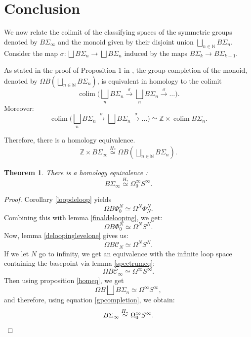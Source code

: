 \documentclass[12pt]{amsart}
\theoremstyle{plain}
\newtheorem{teo}{Theorem}[section]
\theoremstyle{definition}
\theoremstyle{remark}
\newcommand{\C}{\mathcal{C}}
\begin{document}
\section{Conclusion}
We now relate the colimit of the classifying spaces of the symmetric groups denoted by $B\Sigma_\infty$ and the monoid given by their disjoint union $\bigsqcup_{n\in\mathbb{N}} B\Sigma_n$.
Consider the map $\sigma: \bigsqcup B\Sigma_n \rightarrow \bigsqcup B\Sigma_n$ induced by the maps $B\Sigma_k\rightarrow B\Sigma_{k+1}$.

As stated in the proof of Proposition 1 in \cite{mcduffsegal}, the group completion of the monoid, denoted by $\Omega B(\bigsqcup_{n\in\mathbb{N}} B\Sigma_{n})$, is equivalent in homology to the colimit 
\[\operatorname{colim} \bigg(\bigsqcup_n B\Sigma_n\xrightarrow{\sigma} \bigsqcup_n B\Sigma_n\xrightarrow{\sigma}\dots\bigg).\]
Moreover:
\[\operatorname{colim} \bigg(\bigsqcup_n B\Sigma_n\xrightarrow{\sigma} \bigsqcup B\Sigma_n\xrightarrow{\sigma}\dots\bigg) \simeq \mathbb{Z}\times \operatorname{colim}B\Sigma_n.\]

Therefore, there is a homology equivalence.
\begin{align}\label{gpcompletion}
\mathbb{Z}\times B\Sigma_\infty \overset{H_*}{\simeq} \Omega B(\bigsqcup_{n\in\mathbb{N}} B\Sigma_n).
\end{align}

\begin{teo}
There is a homology equivalence :
\[ B\Sigma_\infty \overset{H_*}{\simeq} \Omega^\infty_0 S^\infty.\]
\end{teo}

\begin{proof}
Corollary \ref{loopdeloop} yields 
\[\Omega B \Phi_0^N \simeq \Omega^N \Phi_N^N.\]
Combining this with lemma \ref{finaldelooping}, we get: 
\[\Omega B \Phi_0^N \simeq \Omega^N S^N.\]
Now, lemma \ref{deloopinglevelone} gives us:
\[\Omega B\C_N\simeq \Omega^N S^N.\]
If we let $N$ go to infinity, we get an equivalence with the infinite loop space containing the basepoint via lemma \ref{spectrumeq}:
\[\Omega B\C_\infty \simeq \Omega^\infty S^\infty.\]
Then using proposition \ref{homeq}, we get
\[\Omega B \bigsqcup B\Sigma_n \simeq \Omega^\infty S^\infty,\]
and therefore, using equation \ref{gpcompletion}, we obtain: 
\[B\Sigma_\infty \overset{H_*}{\simeq} \Omega^\infty_0 S^\infty.\qedhere\] 
\end{proof}

\printbibliography
\end{document}
